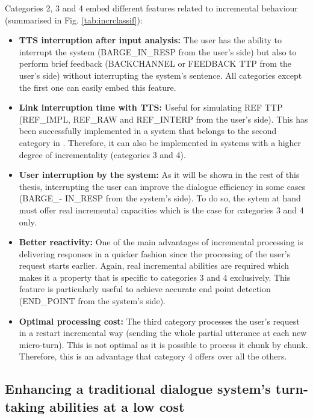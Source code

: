 		Categories 2, 3 and 4 embed different features related to incremental behaviour (summarised in Fig. \ref{tab:incrclassif}):

                \begin{itemize}
                  \item \textbf{TTS interruption after input analysis:} The user has the ability to interrupt the system (BARGE\_IN\_RESP from the user's side) but also to perform brief feedback (BACKCHANNEL or FEEDBACK TTP from the user's side) without interrupting the system's sentence. All categories except the first one can easily embed this feature.
                  \item \textbf{Link interruption time with TTS:} Useful for simulating REF TTP (REF\_IMPL, REF\_RAW and REF\_INTERP from the user's side). This has been successfully implemented in a system that belongs to the second category in \cite{El-Asri2014a}. Therefore, it can also be implemented in systems with a higher degree of incrementality (categories 3 and 4).
                  \item \textbf{User interruption by the system:} As it will be shown in the rest of this thesis, interrupting the user can improve the dialogue efficiency in some cases (BARGE\_- IN\_RESP from the system's side). To do so, the sytem at hand must offer real incremental capacities which is the case for categories 3 and 4 only.
                  \item \textbf{Better reactivity:} One of the main advantages of incremental processing is delivering responses in a quicker fashion since the processing of the user's request starts earlier. Again, real incremental abilities are required which makes it a property that is specific to categories 3 and 4 exclusively. This feature is particularly useful to achieve accurate end point detection (END\_POINT from the system's side).
                  \item \textbf{Optimal processing cost:} The third category processes the user's request in a restart incremental way (sending the whole partial utterance at each new micro-turn). This is not optimal as it is possible to process it chunk by chunk. Therefore, this is an advantage that category 4 offers over all the others.
                \end{itemize}

	\subsection{Enhancing a traditional dialogue system's turn-taking abilities at a low cost}
    
